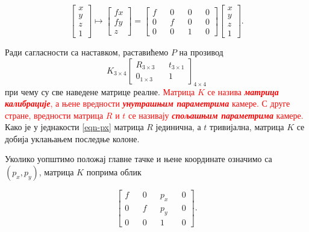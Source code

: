 \documentclass[12pt, a4paper, twoside]{book}
\numberwithin{equation}{chapter}
\numberwithin{theorem}{section}
\numberwithin{definition}{section}
\numberwithin{definitionChapter}{chapter}
\begin{document}
	\begin{equation}
		\begin{bmatrix}
			x \\
			y \\
			z \\
			1
		\end{bmatrix}
		\mapsto
		\begin{bmatrix}
			fx \\
			fy \\
			z
		\end{bmatrix}
		=
		\begin{bmatrix}
			f && 0 && 0 && 0 \\
			0 && f && 0 && 0 \\
			0 && 0 && 1 && 0
		\end{bmatrix}
		\begin{bmatrix}
			x \\
			y \\
			z \\
			1
		\end{bmatrix}.
		\label{eqn-px}
	\end{equation}

	Ради сагласности са наставком, раставићемо $P$ на прозивод
	\begin{equation}
		K_{3\times4}
		\begin{bmatrix}
			R_{3\times3} && t_{3\times1} \\
			0_{1\times3} && 1
		\end{bmatrix}_{4\times4}
		\label{eqn-krt}
	\end{equation}
	при чему су све наведене матрице реалне. %
	\textcolor{red}{Матрица $K$ се назива \textbf{\textit{матрица калибрације}}, а њене вредности \textbf{\textit{унутрашњим параметрима}}
	камере. С друге стране, вредности матрица $R$ и $t$
	се називају \textbf{\textit{спољашњим параметрима}}
	камере.} Како је у једнакости \ref{eqn-px} матрица $R$ јединична, а $t$ тривијална, матрица $K$ се добија
	уклањањем последње колоне.
	
	Уколико уопштимо положај главне тачке и њене координате означимо са $(p_x, p_y)$, матрица $K$
	поприма облик
	
	\begin{equation}
		\begin{bmatrix}
			f && 0 && p_x && 0 \\
			0 && f && p_y && 0\\
			0 && 0 && 1 && 0
		\end{bmatrix}.
	\end{equation}
\end{document}

